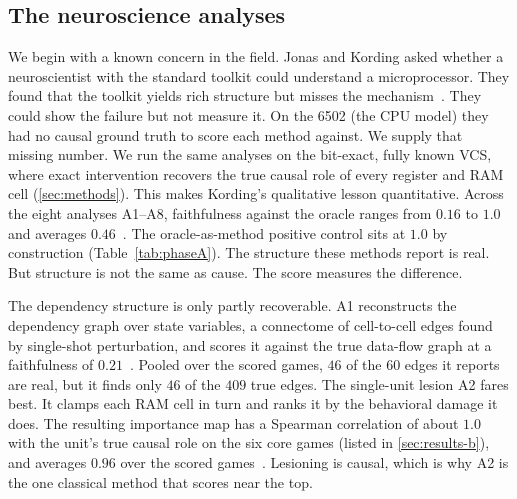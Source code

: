 
\subsection{The neuroscience analyses}\label{sec:results-a}

We begin with a known concern in the field. Jonas and Kording asked whether a
neuroscientist with the standard toolkit could understand a microprocessor. They
found that the toolkit yields rich structure but misses the
mechanism~\cite{jonas2017could}. They could show the failure but not measure it.
On the 6502 (the CPU model) they had no causal ground truth to score each method against. We
supply that missing number. We run the same analyses on the bit-exact, fully
known VCS, where exact intervention recovers the true causal role of every
register and RAM cell (\Sectionname\ref{sec:methods}). This makes Kording's
qualitative lesson quantitative. Across the eight analyses A1--A8,
faithfulness against the oracle ranges from $0.16$ to $1.0$ and averages
$0.46$~\cite{leaderboardP2}. The
oracle-as-method positive
control sits at $1.0$ by construction (Table~\ref{tab:phaseA}). The structure
these methods report is real. But structure is not the same as cause. The score
measures the difference.

The dependency structure is only partly recoverable. A1 reconstructs the dependency
graph over state variables, a connectome of cell-to-cell edges found by single-shot
perturbation, and scores it against the true data-flow graph at a faithfulness of
$0.21$~\cite{leaderboardP2}. Pooled over the scored games, $46$ of the $60$ edges it
reports are real, but it finds only $46$ of the $409$ true edges. The single-unit
lesion A2 fares best. It clamps each RAM cell in turn and ranks it by the
behavioral damage it does. The resulting importance map has a Spearman
correlation of about $1.0$ with the unit's true causal role on the six core games (listed in \Sectionname\ref{sec:results-b}),
and averages $0.96$ over the scored games~\cite{leaderboardP2}. Lesioning is causal,
which is why A2 is the one classical method that scores near the top.

